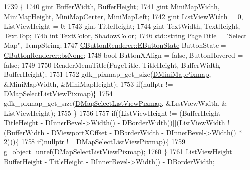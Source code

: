 \begin{DoxyCode}
1739                                           \{
1740     gint BufferWidth, BufferHeight;
1741     gint MiniMapWidth, MiniMapHeight, MiniMapCenter, MiniMapLeft;
1742     gint ListViewWidth = 0, ListViewHeight = 0;
1743     gint TitleHeight;
1744     gint TextWidth, TextHeight, TextTop;
1745     \textcolor{keywordtype}{int} TextColor, ShadowColor;
1746     std::string PageTitle = \textcolor{stringliteral}{"Select Map"}, TempString;
1747     \hyperlink{classCButtonRenderer_ae0eccda184600f6e14bfd59033e5e9a1}{CButtonRenderer::EButtonState} ButtonState = 
      \hyperlink{classCButtonRenderer_ae0eccda184600f6e14bfd59033e5e9a1aa0cd7277705307bef6c50f2250b5d62d}{CButtonRenderer::bsNone};
1748     \textcolor{keywordtype}{bool} ButtonXAlign = \textcolor{keyword}{false}, ButtonHovered = \textcolor{keyword}{false};
1749     
1750     \hyperlink{classCApplicationData_a548c5924a281c7e226fd7cac44e59920}{RenderMenuTitle}(PageTitle, TitleHeight, BufferWidth, BufferHeight); 
1751 
1752     gdk\_pixmap\_get\_size(\hyperlink{classCApplicationData_abe3af81659ead5113b7b2f165a88e737}{DMiniMapPixmap}, &MiniMapWidth, &MiniMapHeight); 
1753     \textcolor{keywordflow}{if}(\textcolor{keyword}{nullptr} != \hyperlink{classCApplicationData_a76e4af228d69ca3c6b1cf0770ca2e7a0}{DMapSelectListViewPixmap})\{
1754         gdk\_pixmap\_get\_size(\hyperlink{classCApplicationData_a76e4af228d69ca3c6b1cf0770ca2e7a0}{DMapSelectListViewPixmap}, &ListViewWidth, &
      ListViewHeight); 
1755     \}
1756 
1757     \textcolor{keywordflow}{if}((ListViewHeight != (BufferHeight - TitleHeight - \hyperlink{classCApplicationData_a29a687c44dceb9e87a56d96612d59ab5}{DInnerBevel}->Width() - 
      \hyperlink{classCApplicationData_a566b69c72fa982c6ecf8e47dc21df489}{DBorderWidth}))||(ListViewWidth != (BufferWidth - \hyperlink{classCApplicationData_a306bba873ccc47126111305fe21ef3ff}{DViewportXOffset} - 
      \hyperlink{classCApplicationData_a566b69c72fa982c6ecf8e47dc21df489}{DBorderWidth} - \hyperlink{classCApplicationData_a29a687c44dceb9e87a56d96612d59ab5}{DInnerBevel}->Width() * 2)))\{
1758         \textcolor{keywordflow}{if}(\textcolor{keyword}{nullptr} != \hyperlink{classCApplicationData_a76e4af228d69ca3c6b1cf0770ca2e7a0}{DMapSelectListViewPixmap})\{
1759             g\_object\_unref(\hyperlink{classCApplicationData_a76e4af228d69ca3c6b1cf0770ca2e7a0}{DMapSelectListViewPixmap});
1760         \}
1761         ListViewHeight = BufferHeight - TitleHeight - \hyperlink{classCApplicationData_a29a687c44dceb9e87a56d96612d59ab5}{DInnerBevel}->Width() - 
      \hyperlink{classCApplicationData_a566b69c72fa982c6ecf8e47dc21df489}{DBorderWidth};

\end{DoxyCode}
